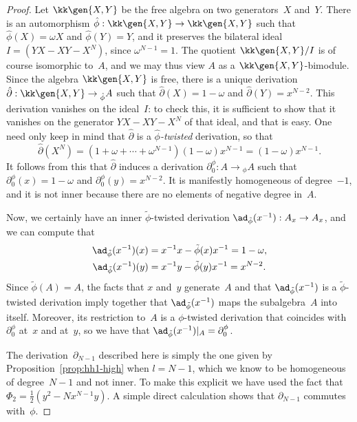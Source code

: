 \begin{proof}
 Let $\kk\gen{X,Y}$ be the free algebra on two generators~$X$
and~$Y$. There is an automorphism $\hat\phi:\kk\gen{X,Y}\to\kk\gen{X,Y}$
such that $\hat\phi(X)=\omega X$ and
$\hat\phi(Y)=Y$, and it preserves the bilateral ideal
$I=(YX-XY-X^N)$, since $\omega^{N-1}=1$. The quotient $\kk\gen{X,Y}/I$ is
of course isomorphic to~$A$, and we may thus view $A$ as a
$\kk\gen{X,Y}$-bimodule. Since the algebra $\kk\gen{X,Y}$ is free, there is
a unique derivation $\hat\partial:\kk\gen{X,Y}\to{}_{\hat\phi} A$ such that
$\hat\partial(X)=1-\omega$ and $\hat\partial(Y)=x^{N-2}$. This derivation
vanishes on the ideal~$I$: to check this, it is sufficient to show that it
vanishes on the generator $YX-XY-X^N$ of that ideal, and that is easy. One
need only keep in mind that $\hat\partial$ is a \emph{$\hat\phi$-twisted}
derivation, so that
  \[
  \hat\partial(X^N)
        = (1+\omega+\cdots+\omega^{N-1})(1-\omega)x^{N-1}
        = (1-\omega)x^{N-1}.
  \]
It follows from this that $\hat\partial$ induces a derivation
$\partial_0^\phi:A\to{}_\phi A$ such that
$\partial_0^\phi(x)=1-\omega$ and $\partial_0^\phi(y)=x^{N-2}$. It
is manifestly homogeneous of degree~$-1$, and it is not inner because there
are no elements of negative degree in~$A$.

Now, we certainly have an inner $\tilde\phi$-twisted derivation
$\ad_{\tilde\phi}(x^{-1}):A_x\to A_x$, and we can compute that
  \begin{align}
  \ad_{\tilde\phi}(x^{-1})(x)
       &= x^{-1}x-\tilde\phi(x)x^{-1}
        = 1-\omega, \\
  \ad_{\tilde\phi}(x^{-1})(y)
       &= x^{-1}y-\tilde\phi(y)x^{-1}
        = x^{N-2}.
  \end{align}
Since $\tilde\phi(A)=A$, the facts that $x$ and~$y$ generate~$A$ and
that $\ad_{\tilde\phi}(x^{-1})$ is a $\tilde\phi$-twisted derivation imply
together that $\ad_{\tilde\phi}(x^{-1})$ maps the subalgebra~$A$ into
itself. Moreover, its restriction to~$A$ is a $\phi$-twisted derivation
that coincides with $\partial^\phi_0$ at~$x$ and at~$y$, so
we have that $\ad_{\tilde\phi}(x^{-1})|_A=\partial^\phi_0$.

 The derivation~$\partial_{N-1}$ described here is simply the
one given by Proposition~\ref{prop:hh1-high} when $l=N-1$, which we know to be
homogeneous of degree~$N-1$ and not inner. To make this explicit we have
used the fact that $\Phi_2 = \frac{1}{2}(y^{2} -N x^{N-1}y)$. A simple
direct calculation shows that $\partial_{N-1}$ commutes with~$\phi$.


\end{proof}
